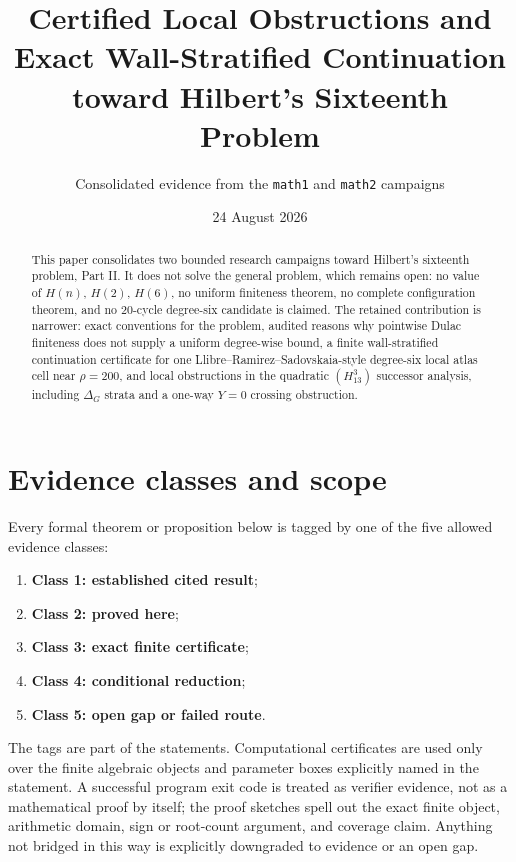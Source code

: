\documentclass[11pt]{article}
\title{Certified Local Obstructions and Exact Wall-Stratified Continuation toward Hilbert's Sixteenth Problem}
\author{Consolidated evidence from the \texttt{math1} and \texttt{math2} campaigns}
\date{24 August 2026}
\newcommand{\classone}{\textbf{Class 1: established cited result}}
\newcommand{\classtwo}{\textbf{Class 2: proved here}}
\newcommand{\classthree}{\textbf{Class 3: exact finite certificate}}
\newcommand{\classfour}{\textbf{Class 4: conditional reduction}}
\newcommand{\classfive}{\textbf{Class 5: open gap or failed route}}
\begin{document}
\maketitle

\begin{abstract}
This paper consolidates two bounded research campaigns toward Hilbert's sixteenth problem, Part II.  It does not solve the general problem, which remains open: no value of \(H(n)\), \(H(2)\), \(H(6)\), no uniform finiteness theorem, no complete configuration theorem, and no 20-cycle degree-six candidate is claimed.  The retained contribution is narrower: exact conventions for the problem, audited reasons why pointwise Dulac finiteness does not supply a uniform degree-wise bound, a finite wall-stratified continuation certificate for one Llibre--Ramirez--Sadovskaia-style degree-six local atlas cell near \(\rho=200\), and local obstructions in the quadratic \((H^3_{13})\) successor analysis, including \(\Delta_G\) strata and a one-way \(Y=0\) crossing obstruction.
\end{abstract}

\section{Evidence classes and scope}
Every formal theorem or proposition below is tagged by one of the five allowed evidence classes:
\begin{enumerate}
\item \classone;
\item \classtwo;
\item \classthree;
\item \classfour;
\item \classfive.
\end{enumerate}
The tags are part of the statements.  Computational certificates are used only over the finite algebraic objects and parameter boxes explicitly named in the statement.  A successful program exit code is treated as verifier evidence, not as a mathematical proof by itself; the proof sketches spell out the exact finite object, arithmetic domain, sign or root-count argument, and coverage claim.  Anything not bridged in this way is explicitly downgraded to evidence or an open gap.
\end{document}
